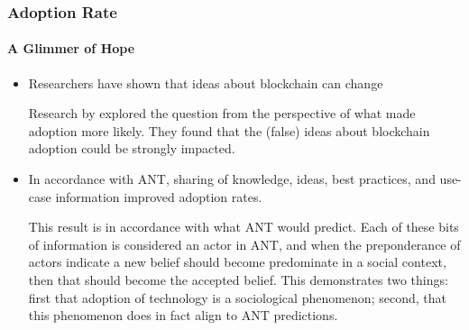 \begin{frame}
  \frametitle{Adoption Rate}
  \framesubtitle{A Glimmer of Hope}
  \begin{itemize}
    \item<1-> Researchers have shown that ideas about blockchain can change

           {\scriptsize{Research by \textcite{fossowambaBigDataAnalytics2018} explored the question from the perspective of what made adoption more likely. They found that the (false) ideas about blockchain adoption could be strongly impacted.}}

    \item<2-> In accordance with ANT, sharing of knowledge, ideas, best practices, and use-case information improved adoption rates.

           {\scriptsize{This result is in accordance with what ANT would predict. Each of these bits of information is considered an actor in ANT, and when the preponderance of actors indicate a new belief should become predominate in a social context, then that should become the accepted belief. This demonstrates two things: first that adoption of technology is a sociological phenomenon; second, that this phenomenon does in fact align to ANT predictions. }}


  \end{itemize}
\end{frame}

